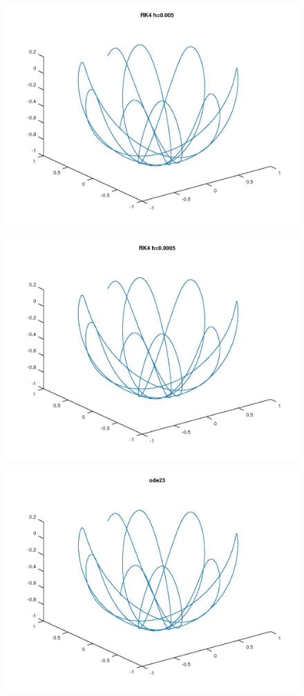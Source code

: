\documentclass{article}
\begin{document}
	\begin{figure}[htp!]
		\centering 
		\includegraphics[width=\textwidth]{6_1_3.jpeg}
	\end{figure}
	\begin{figure}[htp!]
		\centering 
		\includegraphics[width=\textwidth]{6_1_4.jpeg}
	\end{figure}
	\begin{figure}[htp!]
		\centering 
		\includegraphics[width=\textwidth]{6_1_5.jpeg}
	\end{figure}
\end{document}
